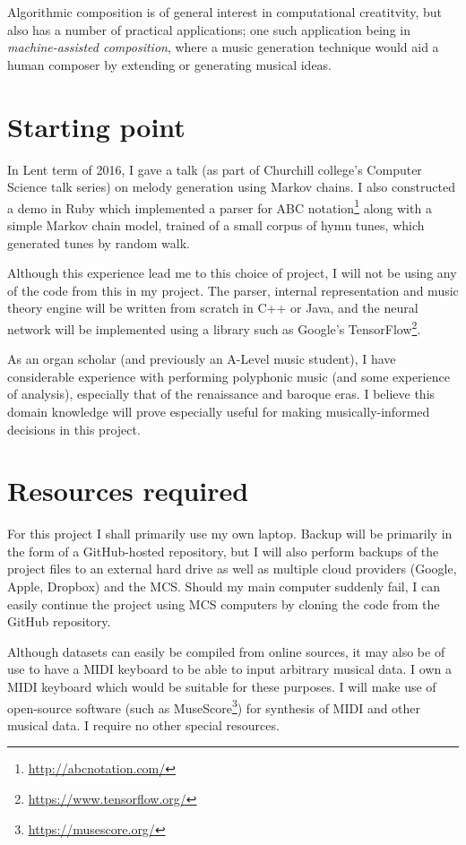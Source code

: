 \documentclass[12pt,a4paper,twoside]{article}
\begin{document}
Algorithmic composition is of general interest in computational creatitvity, but
also has a number of practical applications; one such application being in
\emph{machine-assisted composition}, where a music generation technique would
aid a human composer by extending or generating musical ideas.


\section*{Starting point}

In Lent term of 2016, I gave a talk (as part of Churchill college's Computer
Science talk series) on melody generation using Markov chains. I also
constructed a demo in Ruby which implemented a parser for ABC
notation\footnote{\url{http://abcnotation.com/}} along with a simple Markov
chain model, trained of a small corpus of hymn tunes, which generated tunes by
random walk. 

Although this experience lead me to this choice of project, I will not be using
any of the code from this in my project. The parser, internal representation and
music theory engine will be written from scratch in C++ or Java, and the neural
network will be implemented using a library such as Google's
TensorFlow\footnote{\url{https://www.tensorflow.org/}}.

As an organ scholar (and previously an A-Level music student), I have
considerable experience with performing polyphonic music (and some experience of
analysis), especially that of the renaissance and baroque eras. I believe this
domain knowledge will prove especially useful for making musically-informed
decisions in this project. 

\section*{Resources required}

For this project I shall primarily use my own laptop. Backup will be primarily
in the form of a GitHub-hosted repository, but I will also perform backups of
the project files to an external hard drive as well as multiple cloud providers
(Google, Apple, Dropbox) and the MCS. Should my main computer suddenly fail, I
can easily continue the project using MCS computers by cloning the code from the
GitHub repository.

Although datasets can easily be compiled from online sources, it may also be of
use to have a MIDI keyboard to be able to input arbitrary musical data. I own a
MIDI keyboard which would be suitable for these purposes. I will make use of
open-source software (such as MuseScore\footnote{\url{https://musescore.org/}})
for synthesis of MIDI and other musical data. I require no other special
resources.
\end{document}

